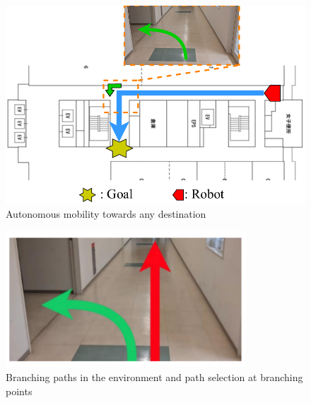 \begin{figure}[htbp]
     \centering
      \includegraphics[width=120mm]{images/pdf/nav_need.pdf}
      \caption{Autonomous mobility towards any destination}\label{fig:nav_need}
 \end{figure}
 \begin{figure}[htbp]
     \centering
      \includegraphics[width=90mm]{images/pdf/branch_path.pdf}
      \caption{Branching paths in the environment and path selection at branching points}\label{fig:haru_select}
 \end{figure}
\newpage
